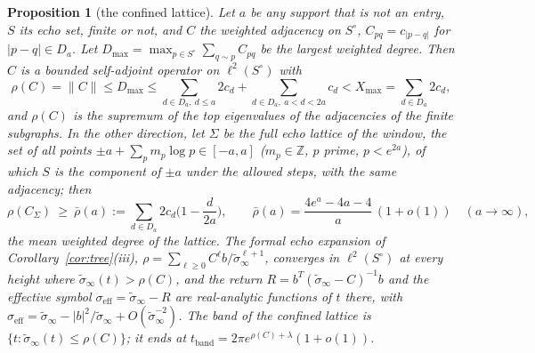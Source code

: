 \documentclass[11pt]{article}
\newtheorem{proposition}[theorem]{Proposition}
\theoremstyle{definition}
\theoremstyle{remark}
\begin{document}
\begin{proposition}[the confined lattice]\label{prop:confined}
Let $a$ be any support that is not an entry, $S$ its echo set, finite or not, and $C$ the weighted adjacency on $S^\circ$, $C_{pq}=c_{|p-q|}$ for $|p-q|\in D_a$. Let $D_{\max}=\max_{p\in S^\circ}\sum_{q\sim p}C_{pq}$ be the largest weighted degree. Then $C$ is a bounded self-adjoint operator on $\ell^2(S^\circ)$ with
\[
\rho(C)=\|C\|\le D_{\max}\le\sum_{d\in D_a,\ d\le a}2c_d+\sum_{d\in D_a,\ a<d<2a}c_d<X_{\max}=\sum_{d\in D_a}2c_d ,
\]
and $\rho(C)$ is the supremum of the top eigenvalues of the adjacencies of the finite subgraphs. In the other direction, let $\Sigma$ be the full echo lattice of the window, the set of all points $\pm a+\sum_pm_p\log p\in[-a,a]$ ($m_p\in\mathbb Z$, $p$ prime, $p<e^{2a}$), of which $S$ is the component of $\pm a$ under the allowed steps, with the same adjacency; then
\[
\rho(C_\Sigma)\ \ge\ \bar\rho(a):=\sum_{d\in D_a}2c_d\Big(1-\frac d{2a}\Big),\qquad \bar\rho(a)=\frac{4e^a-4a-4}{a}\,(1+o(1))\quad(a\to\infty),
\]
the mean weighted degree of the lattice. The formal echo expansion of Corollary~\ref{cor:tree}(iii), $\rho=\sum_{\ell\ge0}C^\ell b/\tilde\sigma_\infty^{\ell+1}$, converges in $\ell^2(S^\circ)$ at every height where $\tilde\sigma_\infty(t)>\rho(C)$, and the return $R=b^T(\tilde\sigma_\infty-C)^{-1}b$ and the effective symbol $\sigma_{\mathrm{eff}}=\tilde\sigma_\infty-R$ are real-analytic functions of $t$ there, with $\sigma_{\mathrm{eff}}=\tilde\sigma_\infty-|b|^2/\tilde\sigma_\infty+O(\tilde\sigma_\infty^{-2})$. The \emph{band of the confined lattice} is $\{t:\tilde\sigma_\infty(t)\le\rho(C)\}$; it ends at $t_{\mathrm{band}}=2\pi e^{\rho(C)+\lambda}(1+o(1))$.
\end{proposition}
\end{document}

